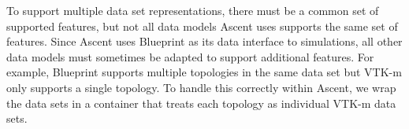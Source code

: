 To support multiple data set representations, there must be a common
set of supported features, but not all data models Ascent uses
supports the same set of features.
%
Since Ascent uses Blueprint as its data interface to simulations,
all other data models must sometimes be adapted to support additional
features.
%
For example, Blueprint supports multiple topologies in the same data set
but VTK-m only supports a single topology.
%
To handle this correctly within Ascent, we wrap the data sets in a container
that treats each topology as individual VTK-m data sets.
%
